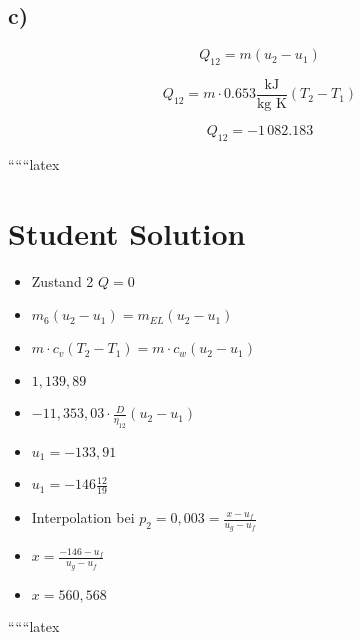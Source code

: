

\subsection*{c)}

\begin{equation*}
Q_{12} = m (u_{2} - u_{1})
\end{equation*}

\begin{equation*}
Q_{12} = m \cdot 0.653 \frac{\text{kJ}}{\text{kg K}} (T_{2} - T_{1})
\end{equation*}

\begin{equation*}
Q_{12} = -1 \, 082.183
\end{equation*}

``````latex


\section*{Student Solution}

\begin{itemize}
    \item Zustand 2 $Q = 0$
    \item $m_6 (u_2 - u_1) = m_{EL} (u_2 - u_1)$
    \item $m \cdot c_v (T_2 - T_1) = m \cdot c_w (u_2 - u_1)$
    \item $1,139,89$
    \item $-11,353,03 \cdot \frac{D}{\eta_{12}} (u_2 - u_1)$
    \item $u_1 = -133,91$
    \item $u_1 = -146 \frac{12}{19}$
    \item Interpolation bei $p_2 = 0,003 = \frac{x - u_f}{u_g - u_f}$
    \item $x = \frac{-146 - u_f}{u_g - u_f}$
    \item $x = 560,568$
\end{itemize}

``````latex